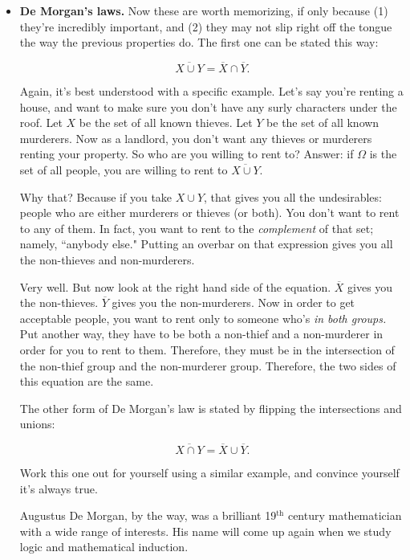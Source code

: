 \begin{itemize}
\item \textbf{De Morgan's laws.} \label{demorganslaws}  Now these are worth
memorizing, if only because (1) they're incredibly important, and (2) they
may not slip right off the tongue the way the previous properties do. The
first one can be stated this way:

\[
\overline{X \cup Y} = \overline{X} \cap \overline{Y}.
\]

Again, it's best understood with a specific example. Let's say you're
renting a house, and want to make sure you don't have any surly characters
under the roof. Let $X$ be the set of all known thieves. Let $Y$ be the set
of all known murderers. Now as a landlord, you don't want any thieves or
murderers renting your property. So who are you willing to rent to? Answer:
if $\Omega$ is the set of all people, you are willing to rent to $\overline{X
\cup Y}$.

Why that? Because if you take $X \cup Y$, that gives you all the
undesirables: people who are either murderers or thieves (or both). You
don't want to rent to any of them. In fact, you want to rent to the
\textit{complement} of that set; namely, ``anybody else." Putting an
overbar on that expression gives you all the non-thieves and non-murderers.

Very well. But now look at the right hand side of the equation. $\overline{X}$
gives you the non-thieves. $\overline{Y}$ gives you the non-murderers. Now in
order to get acceptable people, you want to rent only to someone who's
\textit{in both groups.} Put another way, they have to be both a non-thief
and a non-murderer in order for you to rent to them. Therefore, they must
be in the intersection of the non-thief group and the non-murderer group.
Therefore, the two sides of this equation are the same.

The other form of De Morgan's law is stated by flipping the intersections
and unions: 
 
\[
\overline{X \cap Y} = \overline{X} \cup \overline{Y}.
\]

Work this one out for yourself using a similar example, and convince
yourself it's always true.

Augustus De Morgan, by the way, was a brilliant 19$^\text{th}$ century
mathematician with a wide range of interests. His name will come up again
when we study logic and mathematical induction.

\end{itemize}


